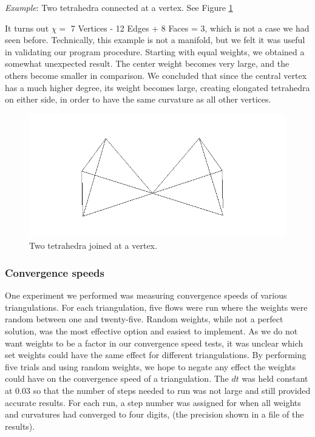 \documentclass[12pt]{article}
\begin{document}
 \textit{Example}: Two tetrahedra connected at a vertex. See Figure \ref{fig:tt}

 It turns out $\chi = $ 7 Vertices - 12 Edges + 8 Faces = 3, which is not a case we had seen before. Technically, this example is not a manifold, but we felt it was useful in validating our program procedure. Starting with equal weights, we obtained a somewhat unexpected result. The center weight becomes very large, and the others become smaller in comparison. We concluded that since the central vertex has a much higher degree, its weight becomes large, creating elongated tetrahedra on either side, in order to have the same curvature as all other vertices.

\begin{figure}
\includegraphics{Pictures3/tetratouch.png}
\caption{Two tetrahedra joined at a vertex.}
\label{fig:tt}
\end{figure}

\subsubsection{Convergence speeds}

One experiment we performed was measuring convergence speeds of various triangulations. For each triangulation, five flows were run where the weights were random between one and twenty-five. Random weights, while not a perfect solution, was the most effective option and easiest to implement. As we do not want weights to be a factor in our convergence speed tests, it was unclear which set weights could have the same effect for different triangulations. By performing five trials and using random weights, we hope to negate any effect the weights could have on the convergence speed of a triangulation. The $dt$ was held constant at 0.03 so that the number of steps needed to run was not large and still provided accurate results. For each run, a step number was assigned for when all weights and curvatures had converged to four digits, (the precision shown in a file of the results).
\end{document}

